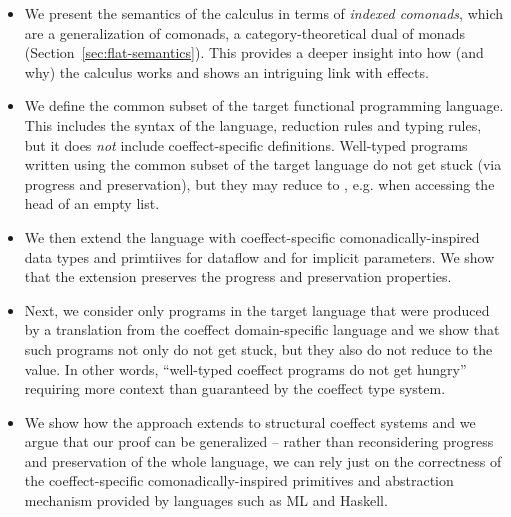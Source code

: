 \begin{itemize}
\item We present the semantics of the calculus in terms of \emph{indexed comonads}, which are a
  generalization of comonads, a category-theoretical dual of monads (Section~\ref{sec:flat-semantics}).
  This provides a deeper insight into how (and why) the calculus works and shows an 
  intriguing link with effects.
  
\item 
  We define the common subset of the target functional programming language. This includes the
  syntax of the language, reduction rules and typing rules, but it does \emph{not} include 
  coeffect-specific definitions. Well-typed programs written using the common subset of the 
  target language do not get stuck (via progress and preservation), but they may reduce to 
  , e.g. when accessing the head of an empty list.
  
\item We then extend the language with coeffect-specific comonadically-inspired
  data types and primtiives for dataflow and for implicit parameters. We show that the extension
  preserves the progress and preservation properties. 
  
\item Next, we consider only programs in the target language that were produced by a
  translation from the coeffect domain-specific language and we show that such programs not only
  do not get stuck, but they also do not reduce to the  value. In other words,
  ``well-typed coeffect programs do not get hungry'' requiring more context than guaranteed
  by the coeffect type system.

\item We show how the approach extends to structural coeffect systems and we argue that our
  proof can be generalized -- rather than reconsidering progress and preservation of the 
  whole language, we can rely just on the correctness of the coeffect-specific comonadically-inspired
  primitives and abstraction mechanism provided by languages such as ML and Haskell.  
\end{itemize}  


%
%

